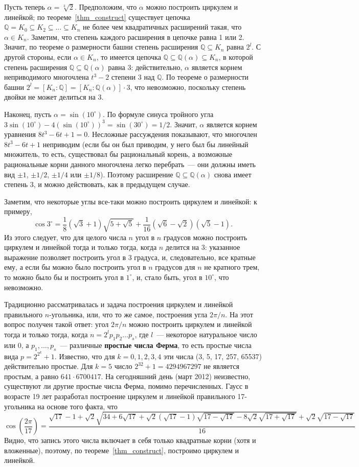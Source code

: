 \documentclass[a4paper,11pt]{scrartcl}
\theoremstyle{plain}
\theoremstyle{definition}
\newcommand\dfn[1]{\textbf{#1}}
\newcommand\mb{\mathbb}
\newcommand\sseq{\subseteq}
\begin{document}
Пусть теперь $\alpha=\sqrt[3]{2}$. Предположим, что $\alpha$ можно
построить циркулем и линейкой; по теореме~\ref{thm_construct}
 существует цепочка $\mb
Q=K_0\sseq K_2\sseq\dots\sseq K_n$ не более чем квадратичных
расширений такая, что $\alpha\in K_n$. Заметим, что степень каждого
расширения в цепочке равна 1 или 2. Значит, по теореме о размерности
башни
степень расширения $\mb Q\sseq K_n$ равна $2^l$. С другой стороны,
если $\alpha\in K_n$, то имеется цепочка $\mb Q\sseq \mb
Q(\alpha)\sseq K_n$, в которой степень расширения $\mb Q\sseq\mb
Q(\alpha)$ равна 3: действительно, $\alpha$ является корнем
неприводимого многочлена $t^3-2$ степени 3 над $\mb Q$. По теореме о
размерности башни $2^l=[K_n:\mb Q]=[K_n:\mb Q(\alpha)]\cdot 3$, что
невозможно, поскольку степень двойки не может делиться на 3.

Наконец, пусть $\alpha=\sin(10^\circ)$. По формуле синуса тройного
угла $3\sin(10^\circ)-4(\sin(10^\circ))^3=\sin(30^\circ)=1/2$. Значит,
$\alpha$ является корнем уравнения $8t^3-6t+1=0$. Несложные
рассуждения показывают, что многочлен $8t^3-6t+1$ неприводим (если бы
он был приводим, у него был бы линейный множитель, то есть,
существовал бы рациональный корень, а возможные рациональные корни
данного многочлена легко перебрать~--- они должны иметь вид $\pm 1$,
$\pm 1/2$, $\pm 1/4$ или $\pm 1/8$). Поэтому расширение $\mb Q\sseq
\mb Q(\alpha)$ снова имеет степень 3, и можно действовать, как в
предыдущем случае.

Заметим, что некоторые углы все-таки можно построить циркулем и
линейкой: к примеру,
$$
\cos 3^\circ=\frac18
(\sqrt{3}+1)\sqrt{5+\sqrt{5}}+\frac{1}{16}(\sqrt{6}-\sqrt{2})(\sqrt{5}-1).
$$
Из этого следует, что для целого числа $n$ угол в $n$ градусов можно
построить циркулем и линейкой тогда и только тогда, когда $n$ делится
на 3: указанное выражение позволяет построить угол в $3$ градуса, и,
следовательно, все кратные ему, а если бы можно было построить угол в
$n$ градусов для $n$ не кратного трем, то можно было бы и построить
угол в $1^\circ$, и, стало быть, угол в $10^\circ$, что невозможно.

Традиционно рассматривалась и задача построения циркулем и линейкой
правильного $n$-угольника, или, что то же самое, построения угла
$2\pi/n$. На этот вопрос получен такой ответ: угол $2\pi/n$ можно
построить
циркулем и линейкой тогда и только тогда, когда $n=2^lp_1p_2\dots
p_s$, где $l$~--- некоторое натуральное число или 0, а
$p_1,\dots,p_s$~--- различные \dfn{простые числа Ферма}, то есть
простые числа вида $p=2^{2^k}+1$. Известно, что для $k=0,1,2,3,4$ эти
числа (3, 5, 17, 257, 65537) действительно простые. Для $k=5$ число
$2^{32}+1=4294967297$ не является простым, а равно $641\cdot
6700417$. На сегодняшний день (март 2012) неизвестно, существуют ли
другие простые числа Ферма, помимо перечисленных. Гаусс в возрасте
19 лет разработал
построение циркулем и линейкой правильного 17-угольника на основе того
факта, что
$$\textstyle
\cos(\frac{2\pi}{17})=
\frac{\sqrt{17}-1+\sqrt{2}\sqrt{34+6\sqrt{17}+\sqrt{2}(\sqrt{17}-1)\sqrt{17-\sqrt{17}}-8\sqrt{2}\sqrt{17+\sqrt{17}}}+\sqrt{2}\sqrt{17-\sqrt{17}}}{16}
$$
Видно, что запись этого числа включает в себя только
квадратные корни (хотя и вложенные), поэтому, по
теореме~\ref{thm_construct}, построимо циркулем и линейкой.
\end{document}
